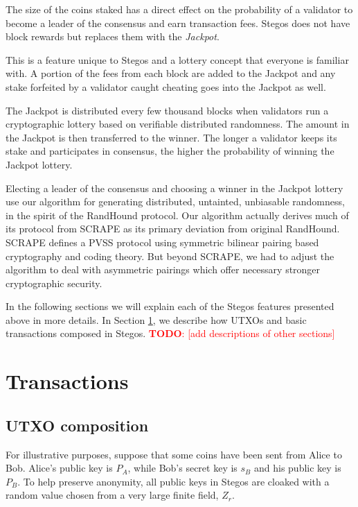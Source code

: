 \documentclass[a4paper, 10pt, conference]{ieeeconf}
\newcommand\todo[1]{\textcolor{red}{\textbf{TODO}: [#1]}}
\begin{document}
The size of the coins staked has a direct effect on the probability of a validator to become a leader of the consensus and earn transaction fees. Stegos does not have block rewards but replaces them with the \textit{Jackpot}.

This is a feature unique to Stegos and a lottery concept that everyone is familiar with. A portion of the fees from each block are added to the Jackpot and any stake forfeited by a validator caught cheating goes into the Jackpot as well.

The Jackpot is distributed every few thousand blocks when validators run a cryptographic lottery based on verifiable distributed randomness. The amount in the Jackpot is then transferred to the winner. The longer a validator keeps its stake and participates in consensus, the higher the probability of winning the Jackpot lottery.

Electing a leader of the consensus and choosing a winner in the Jackpot lottery use our algorithm for generating distributed, untainted, unbiasable randomness, in the spirit of the RandHound protocol\cite{c12}. Our algorithm actually derives much of its protocol from SCRAPE\cite{c13} as its primary deviation from original RandHound. SCRAPE defines a PVSS\cite{c14} protocol using symmetric bilinear pairing based cryptography and coding theory. But beyond SCRAPE, we had to adjust the algorithm to deal with asymmetric pairings which offer necessary stronger cryptographic security.

In the following sections we will explain each of the Stegos features presented above in more details. In Section \ref{transactions}, we describe how UTXOs and basic transactions composed in Stegos. \todo{add descriptions of other sections}

\section{Transactions} \label{transactions}

\subsection{UTXO composition}

For illustrative purposes, suppose that some coins have been sent from Alice to Bob. Alice's public key is $P_A$, while Bob's secret key is $s_B$ and his public key is $P_B$. To help preserve anonymity, all public keys in Stegos are cloaked with a random value chosen from a very large finite field, $Z_r$.
\end{document}
